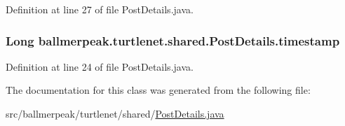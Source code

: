 Definition at line 27 of file Post\-Details.\-java.

\hypertarget{classballmerpeak_1_1turtlenet_1_1shared_1_1PostDetails_a0602043b91650f4eec3d4b71175b7362}{
\subsubsection[{timestamp}]{\setlength{\rightskip}{0pt plus 5cm}Long ballmerpeak.\-turtlenet.\-shared.\-Post\-Details.\-timestamp}}\label{classballmerpeak_1_1turtlenet_1_1shared_1_1PostDetails_a0602043b91650f4eec3d4b71175b7362}


Definition at line 24 of file Post\-Details.\-java.



The documentation for this class was generated from the following file\-:\begin{DoxyCompactItemize}
\item 
src/ballmerpeak/turtlenet/shared/\hyperlink{PostDetails_8java}{Post\-Details.\-java}\end{DoxyCompactItemize}
